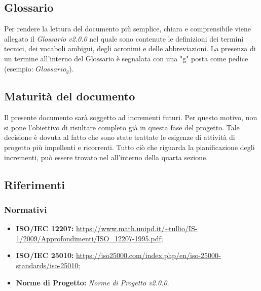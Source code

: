 \subsection{Glossario}
Per rendere la lettura del documento più semplice, chiara e comprensibile viene allegato il \emph{Glossario v2.0.0} nel quale sono contenute le definizioni dei termini tecnici, dei vocaboli ambigui, degli acronimi e delle abbreviazioni. La presenza di un termine all'interno del Glossario è segnalata con una "g" posta come pedice (esempio: $Glossario_{g}$).
\subsection{Maturità del documento}
Il presente documento sarà soggetto ad incrementi futuri. Per questo motivo, non si pone l'obiettivo di risultare completo già in questa fase del progetto.
Tale decisione è dovuta al fatto che sono state trattate le esigenze di attività di progetto più impellenti e ricorrenti.
Tutto ciò che riguarda la pianificazione degli incrementi, può essere trovato nel \emph{} all'interno della quarta sezione.  
\subsection{Riferimenti}

\subsubsection{Normativi}
\begin{itemize}
	\item \textbf{ISO/IEC 12207:} \url{https://www.math.unipd.it/~tullio/IS-1/2009/Approfondimenti/ISO_12207-1995.pdf};
	\item \textbf{ISO/IEC 25010:} \url{https://iso25000.com/index.php/en/iso-25000-standards/iso-25010};
	\item \textbf{Norme di Progetto:} \emph{Norme di Progetto v2.0.0}.
\end{itemize}
